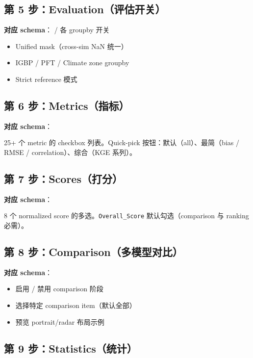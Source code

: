 \subsection{第 5 步：Evaluation（评估开关）}

\textbf{对应 schema}： / 各 groupby 开关

\begin{itemize}
  \item Unified mask（cross-sim NaN 统一）
  \item IGBP / PFT / Climate zone groupby
  \item Strict reference 模式
\end{itemize}

\subsection{第 6 步：Metrics（指标）}

\textbf{对应 schema}：

25+ 个 metric 的 checkbox 列表。Quick-pick 按钮：默认（all）、最简（bias / RMSE / correlation）、综合（KGE 系列）。

\subsection{第 7 步：Scores（打分）}

\textbf{对应 schema}：

8 个 normalized score 的多选。\texttt{Overall\_Score} 默认勾选（comparison 与 ranking 必需）。

\subsection{第 8 步：Comparison（多模型对比）}

\textbf{对应 schema}：

\begin{itemize}
  \item 启用 / 禁用 comparison 阶段
  \item 选择特定 comparison item（默认全部）
  \item 预览 portrait/radar 布局示例
\end{itemize}

\subsection{第 9 步：Statistics（统计）}

